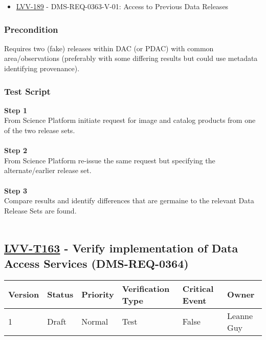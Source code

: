 \begin{itemize}
\tightlist
\item
  \href{https://jira.lsstcorp.org/browse/LVV-189}{LVV-189} -
  DMS-REQ-0363-V-01: Access to Previous Data Releases
\end{itemize}

\hypertarget{precondition-13}{%
\subsubsection{Precondition}\label{precondition-13}}

Requires two (fake) releases within DAC (or PDAC) with common
area/observations (preferably with some differing results but could use
metadata identifying provenance).~

\hypertarget{test-script-139}{%
\subsubsection{Test Script}\label{test-script-139}}

\textbf{Step 1}\\
From Science Platform initiate request for image and catalog products
from one of the two release sets.\\
~\\
\textbf{Step 2}\\
From Science Platform re-issue the same request but specifying the
alternate/earlier release set.\\
~\\
\textbf{Step 3}\\
Compare results and identify differences that are germaine to the
relevant Data Release Sets are found.\\
~\\

\hypertarget{lvv-t163---verify-implementation-of-data-access-services-dms-req-0364}{%
\subsection{\texorpdfstring{\href{https://jira.lsstcorp.org/secure/Tests.jspa\#/testCase/LVV-T163}{LVV-T163}
- Verify implementation of Data Access Services
(DMS-REQ-0364)}{LVV-T163 - Verify implementation of Data Access Services (DMS-REQ-0364)}}\label{lvv-t163---verify-implementation-of-data-access-services-dms-req-0364}}

\begin{longtable}[]{@{}llllll@{}}
\toprule
Version & Status & Priority & Verification Type & Critical Event &
Owner\tabularnewline
\midrule
\endhead
1 & Draft & Normal & Test & False & Leanne Guy\tabularnewline
\bottomrule
\end{longtable}

